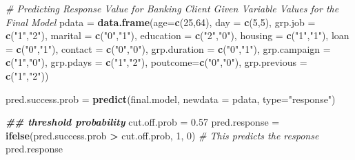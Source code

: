 \documentclass[
]{article}
\newenvironment{Shaded}{\begin{snugshade}}{\end{snugshade}}
\newcommand{\AttributeTok}[1]{\textcolor[rgb]{0.13,0.29,0.53}{#1}}
\newcommand{\CommentTok}[1]{\textcolor[rgb]{0.56,0.35,0.01}{\textit{#1}}}
\newcommand{\DecValTok}[1]{\textcolor[rgb]{0.00,0.00,0.81}{#1}}
\newcommand{\DocumentationTok}[1]{\textcolor[rgb]{0.56,0.35,0.01}{\textbf{\textit{#1}}}}
\newcommand{\FloatTok}[1]{\textcolor[rgb]{0.00,0.00,0.81}{#1}}
\newcommand{\FunctionTok}[1]{\textcolor[rgb]{0.13,0.29,0.53}{\textbf{#1}}}
\newcommand{\NormalTok}[1]{#1}
\newcommand{\OtherTok}[1]{\textcolor[rgb]{0.56,0.35,0.01}{#1}}
\newcommand{\SpecialCharTok}[1]{\textcolor[rgb]{0.81,0.36,0.00}{\textbf{#1}}}
\newcommand{\StringTok}[1]{\textcolor[rgb]{0.31,0.60,0.02}{#1}}
\begin{document}
\begin{Shaded}
\begin{Highlighting}[]
\CommentTok{\# Predicting Response Value for Banking Client Given Variable Values for the Final Model}
\NormalTok{pdata }\OtherTok{=} \FunctionTok{data.frame}\NormalTok{(}\AttributeTok{age=}\FunctionTok{c}\NormalTok{(}\DecValTok{25}\NormalTok{,}\DecValTok{64}\NormalTok{),}
                       \AttributeTok{day =} \FunctionTok{c}\NormalTok{(}\DecValTok{5}\NormalTok{,}\DecValTok{5}\NormalTok{),}
                       \AttributeTok{grp.job =} \FunctionTok{c}\NormalTok{(}\StringTok{"1"}\NormalTok{,}\StringTok{"2"}\NormalTok{),}
                       \AttributeTok{marital =} \FunctionTok{c}\NormalTok{(}\StringTok{"0"}\NormalTok{,}\StringTok{"1"}\NormalTok{),}
                       \AttributeTok{education =} \FunctionTok{c}\NormalTok{(}\StringTok{"2"}\NormalTok{,}\StringTok{"0"}\NormalTok{),}
                       \AttributeTok{housing =} \FunctionTok{c}\NormalTok{(}\StringTok{"1"}\NormalTok{,}\StringTok{"1"}\NormalTok{),}
                       \AttributeTok{loan =} \FunctionTok{c}\NormalTok{(}\StringTok{"0"}\NormalTok{,}\StringTok{"1"}\NormalTok{),}
                       \AttributeTok{contact =} \FunctionTok{c}\NormalTok{(}\StringTok{"0"}\NormalTok{,}\StringTok{"0"}\NormalTok{),}
                       \AttributeTok{grp.duration =} \FunctionTok{c}\NormalTok{(}\StringTok{"0"}\NormalTok{,}\StringTok{"1"}\NormalTok{),}
                       \AttributeTok{grp.campaign =} \FunctionTok{c}\NormalTok{(}\StringTok{"1"}\NormalTok{,}\StringTok{"0"}\NormalTok{),}
                       \AttributeTok{grp.pdays =} \FunctionTok{c}\NormalTok{(}\StringTok{"1"}\NormalTok{,}\StringTok{"2"}\NormalTok{),}
                      \AttributeTok{poutcome=}\FunctionTok{c}\NormalTok{(}\StringTok{"0"}\NormalTok{,}\StringTok{"0"}\NormalTok{),}
                       \AttributeTok{grp.previous =} \FunctionTok{c}\NormalTok{(}\StringTok{"1"}\NormalTok{,}\StringTok{"2"}\NormalTok{))}
          



\NormalTok{pred.success.prob }\OtherTok{=} \FunctionTok{predict}\NormalTok{(final.model, }\AttributeTok{newdata =}\NormalTok{ pdata, }\AttributeTok{type=}\StringTok{"response"}\NormalTok{)}

\DocumentationTok{\#\# threshold probability}
\NormalTok{cut.off.prob }\OtherTok{=} \FloatTok{0.57}
\NormalTok{pred.response }\OtherTok{=} \FunctionTok{ifelse}\NormalTok{(pred.success.prob }\SpecialCharTok{\textgreater{}}\NormalTok{ cut.off.prob, }\DecValTok{1}\NormalTok{, }\DecValTok{0}\NormalTok{)  }\CommentTok{\# This predicts the response}
\NormalTok{pred.response}
\end{Highlighting}
\end{Shaded}
\end{document}
